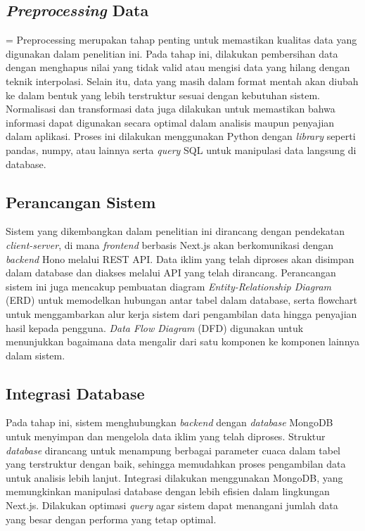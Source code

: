 \subsection{\textit{Preprocessing} Data}=
Preprocessing merupakan tahap penting untuk memastikan kualitas data yang digunakan dalam penelitian ini. Pada tahap ini, dilakukan pembersihan data dengan menghapus nilai yang tidak valid atau mengisi data yang hilang dengan teknik interpolasi. Selain itu, data yang masih dalam format mentah akan diubah ke dalam bentuk yang lebih terstruktur sesuai dengan kebutuhan sistem. Normalisasi dan transformasi data juga dilakukan untuk memastikan bahwa informasi dapat digunakan secara optimal dalam analisis maupun penyajian dalam aplikasi. Proses ini dilakukan menggunakan Python dengan \textit{library} seperti pandas, numpy, atau lainnya serta \textit{query} SQL untuk manipulasi data langsung di database.


\subsection{Perancangan Sistem}
Sistem yang dikembangkan dalam penelitian ini dirancang dengan pendekatan \textit{client-server}, di mana \textit{frontend} berbasis Next.js akan berkomunikasi dengan \textit{backend} Hono melalui REST API. Data iklim yang telah diproses akan disimpan dalam database dan diakses melalui API yang telah dirancang. Perancangan sistem ini juga mencakup pembuatan diagram \textit{Entity-Relationship Diagram} (ERD) untuk memodelkan hubungan antar tabel dalam database, serta flowchart untuk menggambarkan alur kerja sistem dari pengambilan data hingga penyajian hasil kepada pengguna. \textit{Data Flow Diagram} (DFD) digunakan untuk menunjukkan bagaimana data mengalir dari satu komponen ke komponen lainnya dalam sistem.


\subsection{Integrasi Database}
Pada tahap ini, sistem menghubungkan \textit{backend} dengan \textit{database} MongoDB untuk menyimpan dan mengelola data iklim yang telah diproses. Struktur \textit{database} dirancang untuk menampung berbagai parameter cuaca dalam tabel yang terstruktur dengan baik, sehingga memudahkan proses pengambilan data untuk analisis lebih lanjut. Integrasi dilakukan menggunakan MongoDB, yang memungkinkan manipulasi database dengan lebih efisien dalam lingkungan Next.js. Dilakukan optimasi \textit{query} agar sistem dapat menangani jumlah data yang besar dengan performa yang tetap optimal.

